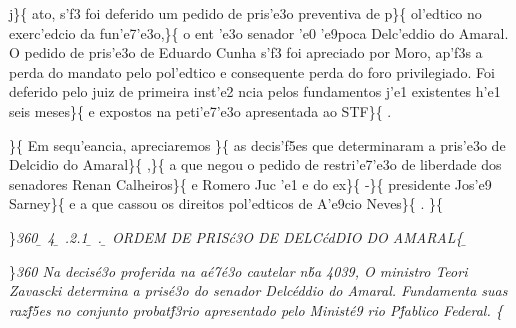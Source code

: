 \ltrch{}  j\}\{\rtlch{}  \ltrch{}
 ato, s'f3 foi deferido um pedido de
pris'e3o preventiva de p\}\{\rtlch{}  \ltrch{} 
ol'edtico no exerc'edcio da fun'e7'e3o,\}\{\rtlch{}  \ltrch{}
 o ent 'e3o senador 'e0 'e9poca
Delc'eddio do Amaral. O pedido de pris'e3o de Eduardo Cunha s'f3 foi
apreciado por Moro, ap'f3s a perda do mandato pelo pol'edtico e
consequente perda do foro privilegiado. Foi deferido pelo juiz de
primeira inst'e2 ncia pelos fundamentos j'e1 existentes h'e1 seis
meses\}\{\rtlch{}  \ltrch{}  e
expostos na peti'e7'e3o apresentada ao STF\}\{\rtlch{} 
\ltrch{}  . \par \tab \}\{\rtlch{}
 \ltrch{}  Em sequ'eancia,
apreciaremos \}\{\rtlch{}  \ltrch{}
 as decis'f5es que determinaram a
pris'e3o de Delcidio do Amaral\}\{\rtlch{}  \ltrch{}
 ,\}\{\rtlch{}  \ltrch{}
 a que negou o pedido de restri'e7'e3o
de liberdade dos senadores Renan Calheiros\}\{\rtlch{} 
\ltrch{}  e Romero Juc 'e1 e do
ex\}\{\rtlch{}  \ltrch{}  -\}\{\rtlch{} 
\ltrch{}  presidente Jos'e9
Sarney\}\{\rtlch{}  \ltrch{}  e a que cassou os
direitos pol'edticos de A'e9cio Neves\}\{ \rtlch{}  \ltrch{}
 . \}\{\rtlch{}  \ltrch{}
\\
\par \}\pard \ltrpar\ql {}\sl360\widctlpar\wrapdefault\aspalpha\aspnum\faauto\adjustright{} {\rtlch{} \ab{} \ltrch{} \b{} 4}{\rtlch{} \ab{} 
\ltrch{} \b{} .2.1}{\rtlch{} \ab{} \ltrch{} \b{} .}{\rtlch{} \ab{} \ltrch{} \b{}  ORDEM DE PRIS\'c3O DE DELC\'cdDIO DO AMARAL}\{
\rtlch{} \ab{} \ltrch{}
\b{}
\par \}\pard \ltrpar\qj {}\sl360\widctlpar\wrapdefault\aspalpha\aspnum\faauto\adjustright{} {\rtlch{}  \ltrch{}  \tab }{\rtlch{}  \ltrch{} 
 Na decis\'e3o proferida na a\'e7\'e3o cautelar n\'ba 4039, O ministro Teori Zavascki determina a pris\'e3o do senador Delc\'eddio do Amaral. Fundamenta suas raz\'f5es no conjunto probat\'f3rio apresentado pelo Minist\'e9
rio P\'fablico Federal. }{\rtlch{}  \ltrch{}  \tab }\{\rtlch{}
